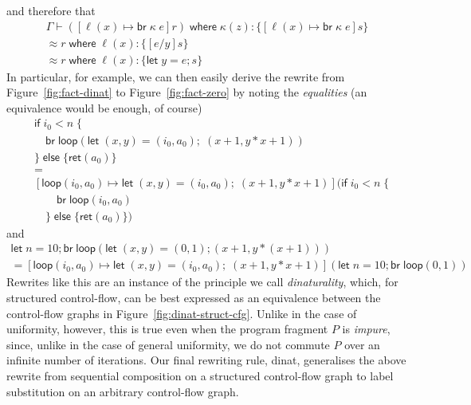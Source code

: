 \documentclass[acmsmall,screen,review]{acmart}
\newcommand{\ms}[1]{\ensuremath{\mathsf{#1}}}
\newcommand{\lto}{:}
\newcommand{\letexpr}[3]{\ensuremath{\ms{let}\;#1 = #2;\;#3}}
\newcommand{\letstmt}[3]{\ensuremath{\ms{let}\;#1 = #2; #3}}
\newcommand{\brb}[2]{\ms{br}\;#1\;#2}
\newcommand{\where}[2]{#1\;\ms{where}\;#2}
\newcommand{\wbranch}[3]{#1(#2) \lto \{#3\}}
\newcommand{\teqv}{\approx}
\newcommand{\brle}[1]{{\textsf{#1}}}
\begin{document}
and therefore that
\begin{multline*}
  \Gamma \vdash \where{([\ell(x) \mapsto \brb{\kappa}{e}]r)}{
    \wbranch{\kappa}{z}{[\ell(x) \mapsto \brb{\kappa}{e}]s}} \\ \teqv
    \where{r}{
    \wbranch{\ell}{x}{[e/y]s}} \\ \teqv
    \where{r}{
    \wbranch{\ell}{x}{\letstmt{y}{e}{s}}} 
\end{multline*}
In particular, for example, we can then easily derive the rewrite from Figure~\ref{fig:fact-dinat}
to Figure~\ref{fig:fact-zero} by noting the \emph{equalities} (an equivalence would be enough, of
course)
\begin{align*}
  & \ms{if}\;i_0 < n\;\{ \\ & \quad
    \ms{br}\;\ms{loop}(
      \letexpr{(x, y)}{(i_0, a_0)}{(x + 1, y * x + 1)}
    ) \\ &
  \}\;\ms{else}\;\{
    \ms{ret}(a_0)
  \} \\ &
  = \\ &
  [\ms{loop}(i_0, a_0) \mapsto \letexpr{(x, y)}{(i_0, a_0)}{(x + 1, y * x + 1)}]
  (
    \ms{if}\;i_0 < n\;\{ 
    \\ & \qquad
      \ms{br}\;\ms{loop}(i_0, a_0) \\ & \quad
    \}\;\ms{else}\;\{
      \ms{ret}(a_0)
    \}
  )
\end{align*}
and
\begin{multline*}
  \letstmt{n}{10}{\ms{br}\;\ms{loop}(
    \letstmt{(x, y)}{(0, 1)}{(x + 1, y * (x + 1))}
  )} \\
  =
  [\ms{loop}(i_0, a_0) \mapsto \letexpr{(x, y)}{(i_0, a_0)}{(x + 1, y * x + 1)}](
    \letstmt{n}{10}{\ms{br}\;\ms{loop}(0, 1)}
  )
\end{multline*}
Rewrites like this are an instance of the principle we call \emph{dinaturality}, which, for
structured control-flow, can be best expressed as an equivalence between the control-flow graphs in
Figure~\ref{fig:dinat-struct-cfg}. Unlike in the case of uniformity, however, this is true even when
the program fragment $P$ is \emph{impure}, since, unlike in the case of general uniformity, we do
not commute $P$ over an infinite number of iterations. Our final rewriting rule, \brle{dinat},
generalises the above rewrite from sequential composition on a structured control-flow graph to
label substitution on an arbitrary control-flow graph. 
\end{document}
